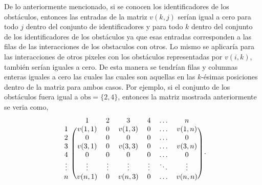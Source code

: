 \begin{enumerate}
\begin{solution}
        De lo anteriormente mencionado, si se conocen los identificadores de los obstáculos, entonces las entradas de la matriz $v(k, j)$ serían igual a cero para todo $j$ dentro del conjunto de identificadores y para todo $k$ dentro del conjunto de los identificadores de los obstáculos ya que esas entradas corresponden a las filas de las interacciones de los obstaculos con otros. Lo mismo se aplicaría para las interacciones de otros pixeles con los obstáculos representadas por $v(i, k)$, también serían iguales a cero. De esta manera se tendrían filas y columnas enteras iguales a cero las cuales las cuales son aquellas en las $k$-ésimas posiciones dentro de la matriz para ambos casos. Por ejemplo, si el conjunto de los obstáculos fuera igual a $\text{obs} = \{2, 4\}$, entonces la matriz mostrada anteriormente se veria como,
        \begin{equation*}
            \begin{blockarray}{c c c c c c c}
                & 1 & 2 & 3 & 4 & \hdots & n \\
                \begin{block}{c (c c c c c c)}
                    1 & v(1,1) & 0 & v(1,3) & 0 & \hdots & v(1,n) \\
                    2 & 0 & 0 & 0 & 0 & \hdots & 0 \\
                    3 & v(3,1) & 0 & v(3,3) & 0 & \hdots & v(3,n) \\
                    4 & 0 & 0 & 0 & 0 & \hdots & 0 \\
                    \vdots & \vdots & \vdots & \vdots & \vdots & \ddots & \vdots \\
                    n & v(n,1) & 0 & v(n,3) & 0 & \hdots & v(n,n) \\
                \end{block}
            \end{blockarray}\ .
            \end{equation*}


\end{solution}
\end{enumerate}
